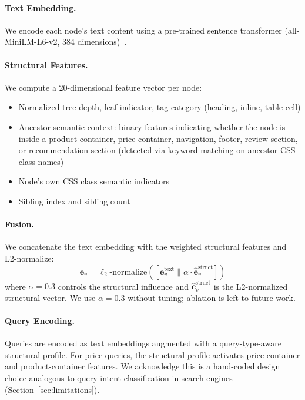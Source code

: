 \documentclass[11pt]{article}
\begin{document}
\paragraph{Text Embedding.} We encode each node's text content using a pre-trained sentence transformer (all-MiniLM-L6-v2, 384 dimensions)~\cite{reimers2019}.

\paragraph{Structural Features.} We compute a 20-dimensional feature vector per node:
\begin{itemize}
    \item Normalized tree depth, leaf indicator, tag category (heading, inline, table cell)
    \item Ancestor semantic context: binary features indicating whether the node is inside a product container, price container, navigation, footer, review section, or recommendation section (detected via keyword matching on ancestor CSS class names)
    \item Node's own CSS class semantic indicators
    \item Sibling index and sibling count
\end{itemize}

\paragraph{Fusion.} We concatenate the text embedding with the weighted structural features and L2-normalize:
\begin{equation}
    \mathbf{e}_v = \ell_2\text{-normalize}([\mathbf{e}_v^{\text{text}} \| \alpha \cdot \hat{\mathbf{e}}_v^{\text{struct}}])
\end{equation}
where $\alpha = 0.3$ controls the structural influence and $\hat{\mathbf{e}}_v^{\text{struct}}$ is the L2-normalized structural vector. We use $\alpha = 0.3$ without tuning; ablation is left to future work.

\paragraph{Query Encoding.} Queries are encoded as text embeddings augmented with a query-type-aware structural profile. For price queries, the structural profile activates price-container and product-container features. We acknowledge this is a hand-coded design choice analogous to query intent classification in search engines (Section~\ref{sec:limitations}).
\end{document}
